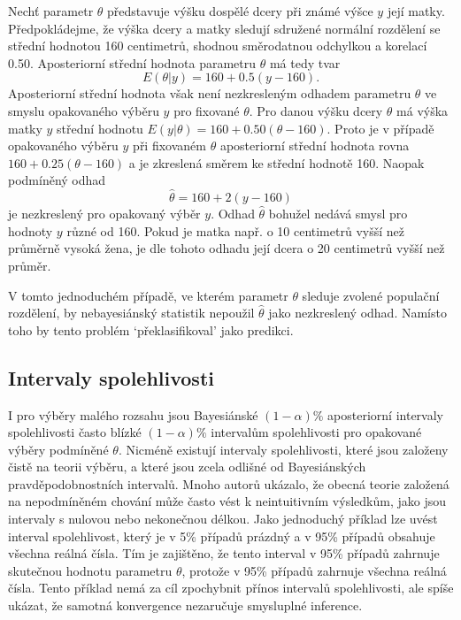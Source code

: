Nechť parametr $\theta$ představuje výšku dospělé dcery při známé výšce $y$ její matky. Předpokládejme, že výška dcery a matky sledují sdružené normální rozdělení se střední hodnotou 160 centimetrů, shodnou směrodatnou odchylkou a korelací 0.50. Aposteriorní střední hodnota parametru $\theta$ má tedy tvar
\begin{equation}
E(\theta | y) = 160 + 0.5(y - 160).
\end{equation}
Aposteriorní střední hodnota však není nezkresleným odhadem parametru $\theta$ ve smyslu opakovaného výběru $y$ pro fixované $\theta$. Pro danou výšku dcery $\theta$ má výška matky $y$ střední hodnotu $E(y | \theta) = 160 + 0.50(\theta - 160)$. Proto je v případě opakovaného výběru $y$ při fixovaném $\theta$ aposteriorní střední hodnota rovna $160 + 0.25(\theta - 160)$ a je zkreslená směrem ke střední hodnotě 160. Naopak podmíněný odhad
\begin{equation}
\hat{\theta} = 160 + 2(y - 160)
\end{equation}
je nezkreslený pro opakovaný výběr $y$. Odhad $\hat{\theta}$ bohužel nedává smysl pro hodnoty $y$ různé od 160. Pokud je matka např. o 10 centimetrů vyšší než průměrně vysoká žena, je dle tohoto odhadu její dcera o 20 centimetrů vyšší než průměr.

V tomto jednoduchém případě, ve kterém parametr $\theta$ sleduje zvolené populační rozdělení, by nebayesiánský statistik nepoužil $\hat{\theta}$ jako nezkreslený odhad. Namísto toho by tento problém `překlasifikoval' jako predikci.

\subsection{Intervaly spolehlivosti}

I pro výběry malého rozsahu jsou Bayesiánské $(1 - \alpha)\%$ aposteriorní intervaly spolehlivosti často blízké $(1 - \alpha)\%$ intervalům spolehlivosti pro opakované výběry podmíněné $\theta$. Nicméně existují intervaly spolehlivosti, které jsou založeny čistě na teorii výběru, a které jsou zcela odlišné od Bayesiánských pravděpodobnostních intervalů. Mnoho autorů ukázalo, že obecná teorie založená na nepodmíněném chování může často vést k neintuitivním výsledkům, jako jsou intervaly s nulovou nebo nekonečnou délkou. Jako jednoduchý příklad lze uvést interval spolehlivost, který je v 5\% případů prázdný a v 95\% případů obsahuje všechna reálná čísla. Tím je zajištěno, že tento interval v 95\% případů zahrnuje skutečnou hodnotu parametru $\theta$, protože v 95\% případů zahrnuje všechna reálná čísla. Tento příklad nemá za cíl zpochybnit přínos intervalů spolehlivosti, ale spíše ukázat, že samotná konvergence nezaručuje smysluplné inference.


